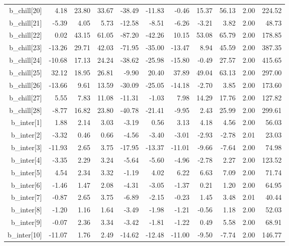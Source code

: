 \documentclass[11pt]{article}
\begin{document}
\begin{table}[ht]
\begin{tabular}{rrrrrrrrrrr}
  b\_chill[20] & 4.18 & 23.80 & 33.67 & -38.49 & -11.83 & -0.46 & 15.37 & 56.13 & 2.00 & 224.52 \\ 
  b\_chill[21] & -5.39 & 4.05 & 5.73 & -12.58 & -8.51 & -6.26 & -3.21 & 3.82 & 2.00 & 48.73 \\ 
  b\_chill[22] & 0.02 & 43.15 & 61.05 & -87.20 & -42.26 & 10.15 & 53.08 & 65.79 & 2.00 & 178.85 \\ 
  b\_chill[23] & -13.26 & 29.71 & 42.03 & -71.95 & -35.00 & -13.47 & 8.94 & 45.59 & 2.00 & 387.35 \\ 
  b\_chill[24] & -10.68 & 17.13 & 24.24 & -38.62 & -25.98 & -15.80 & -0.49 & 27.57 & 2.00 & 415.65 \\ 
  b\_chill[25] & 32.12 & 18.95 & 26.81 & -9.90 & 20.40 & 37.89 & 49.04 & 63.13 & 2.00 & 297.00 \\ 
  b\_chill[26] & -13.66 & 9.61 & 13.59 & -30.09 & -25.05 & -14.18 & -2.70 & 3.85 & 2.00 & 173.60 \\ 
  b\_chill[27] & 5.55 & 7.83 & 11.08 & -11.31 & -1.03 & 7.98 & 14.29 & 17.76 & 2.00 & 127.82 \\ 
  b\_chill[28] & -8.77 & 16.82 & 23.80 & -40.78 & -21.41 & -9.95 & 2.43 & 25.99 & 2.00 & 299.61 \\ 
  b\_inter[1] & 1.88 & 2.14 & 3.03 & -3.19 & 0.56 & 3.13 & 4.18 & 4.56 & 2.00 & 56.03 \\ 
  b\_inter[2] & -3.32 & 0.46 & 0.66 & -4.56 & -3.40 & -3.01 & -2.93 & -2.78 & 2.01 & 23.03 \\ 
  b\_inter[3] & -11.93 & 2.65 & 3.75 & -17.95 & -13.37 & -11.01 & -9.66 & -7.64 & 2.00 & 74.98 \\ 
  b\_inter[4] & -3.35 & 2.29 & 3.24 & -5.64 & -5.60 & -4.96 & -2.78 & 2.27 & 2.00 & 123.52 \\ 
  b\_inter[5] & 4.54 & 2.34 & 3.32 & -1.19 & 4.02 & 6.22 & 6.63 & 7.09 & 2.00 & 71.74 \\ 
  b\_inter[6] & -1.46 & 1.47 & 2.08 & -4.31 & -3.05 & -1.37 & 0.21 & 1.20 & 2.00 & 64.95 \\ 
  b\_inter[7] & -0.87 & 2.65 & 3.75 & -6.89 & -2.15 & -0.23 & 1.45 & 3.48 & 2.01 & 40.44 \\ 
  b\_inter[8] & -1.20 & 1.16 & 1.64 & -3.49 & -1.98 & -1.21 & -0.56 & 1.18 & 2.00 & 52.03 \\ 
  b\_inter[9] & -0.07 & 2.36 & 3.34 & -3.42 & -1.81 & -1.22 & 0.49 & 5.58 & 2.00 & 68.91 \\ 
  b\_inter[10] & -11.07 & 1.76 & 2.49 & -14.62 & -12.48 & -11.00 & -9.50 & -7.74 & 2.00 & 146.77 \\ 

\end{tabular}
\end{table}
\end{document}
